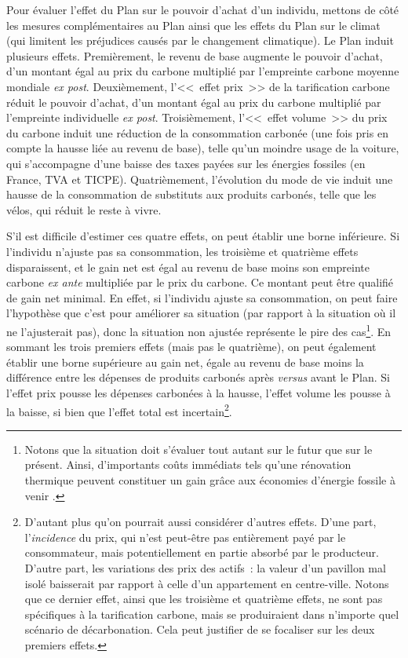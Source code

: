 \documentclass[a5paper,french,openany]{memoir}
\begin{document}
Pour évaluer l'effet du Plan sur le pouvoir d'achat d'un individu, mettons de côté les mesures complémentaires au Plan ainsi que les effets du Plan sur le climat (qui limitent les préjudices causés par le changement climatique). Le Plan induit plusieurs effets. Premièrement, le revenu de base augmente le pouvoir d'achat, d'un montant égal au prix du carbone multiplié par l'empreinte carbone moyenne mondiale \textit{ex post}. Deuxièmement, l'<<~effet prix~>> de la tarification carbone réduit le pouvoir d'achat, d'un montant égal au prix du carbone multiplié par l'empreinte individuelle \textit{ex post}. Troisièmement, l'<<~effet volume~>> du prix du carbone induit une réduction de la consommation carbonée (une fois pris en compte la hausse liée au revenu de base), telle qu'un moindre usage de la voiture, qui s'accompagne d'une baisse des taxes payées sur les énergies fossiles (en France, TVA et TICPE). Quatrièmement, l'évolution du mode de vie induit une hausse de la consommation de substituts aux produits carbonés, telle que les vélos, qui réduit le reste à vivre. %

S'il est difficile d'estimer ces quatre effets, on peut établir une borne inférieure. Si l'individu n'ajuste pas sa consommation, les troisième et quatrième effets disparaissent, et le gain net est égal au revenu de base moins son empreinte carbone \textit{ex ante} multipliée par le prix du carbone. Ce montant peut être qualifié de gain net minimal. En effet, si l'individu ajuste sa consommation, on peut faire l'hypothèse que c'est pour améliorer sa situation (par rapport à la situation où il ne l'ajusterait pas), donc la situation non ajustée représente le pire des cas\footnote{Notons que la situation doit s'évaluer tout autant sur le futur que sur le présent. Ainsi, d'importants coûts immédiats  tels qu'une rénovation thermique peuvent constituer un gain grâce aux économies d'énergie fossile à venir%
.}. En sommant les trois premiers effets (mais pas le quatrième), on peut également établir une borne supérieure au gain net, égale au revenu de base moins la différence entre les dépenses de produits carbonés après \textit{versus} avant le Plan. 
Si l'effet prix pousse les dépenses carbonées à la hausse, l'effet volume les pousse à la baisse, si bien que l'effet total est incertain\footnote{D'autant plus qu'on pourrait aussi considérer d'autres effets. D'une part, l'\textit{incidence} du prix, qui n'est peut-être pas entièrement payé par le consommateur, mais potentiellement en partie absorbé par le producteur. D'autre part, les variations des prix des actifs~: la valeur d'un pavillon mal isolé baisserait par rapport à celle d'un appartement en centre-ville. Notons que ce dernier effet, ainsi que les troisième et quatrième effets, ne sont pas spécifiques à la tarification carbone, mais se produiraient dans n'importe quel scénario de décarbonation. Cela peut justifier de se focaliser sur les deux premiers effets.}. 
\end{document}
